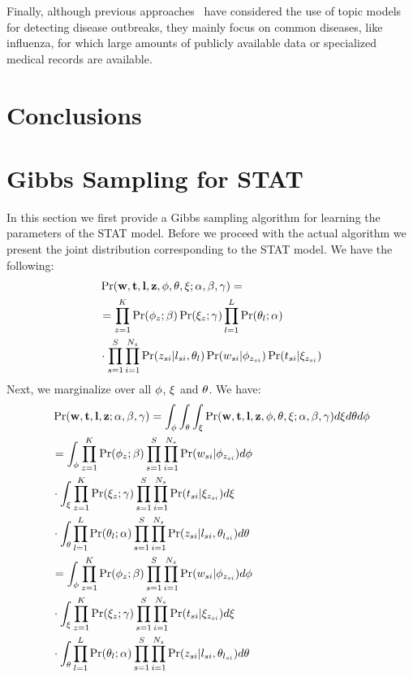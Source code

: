 \documentclass[conference]{IEEEtran}
\newcommand{\model}{{STAT}\xspace} %
\newcommand{\w}{{\bf w}}
\newcommand{\z}{{\bf z}}
\newcommand{\loc}{{\bf l}}
\newcommand{\tim}{{\bf t}}
\begin{document}
Finally, although previous approaches~\cite{paul:11, sadilek:2012, rider:2013} have considered the use of topic models for detecting disease outbreaks, they mainly focus on common diseases, like influenza, for which large amounts of publicly available data or specialized medical records are available. 

\section{Conclusions}
\label{sec:conclusion}




\appendix
\section{Gibbs Sampling for \model}
\label{sec:gibbs}
In this section we first provide a Gibbs sampling algorithm for learning the parameters of the \model model. Before we proceed with the actual algorithm we present the joint distribution corresponding to the \model model. We have the following:
{\scriptsize
\begin{align}
&\Pr(\w,\tim,\loc,\z,{\bf \phi},{\bf \theta},{\bf \xi};\alpha,\beta,\gamma) =  \nonumber \\
&=\prod_{z = 1}^{K}\Pr(\phi_z;\beta)\Pr(\xi_z;\gamma) \prod_{l = 1}^{L}\Pr(\theta_l;\alpha) \nonumber \\
& \cdot \prod_{s = 1}^{S}\prod_{i = 1}^{N_s} \Pr(z_{si}|l_{si},\theta_l)\Pr(w_{si}|\phi_{z_{si}})\Pr(t_{si}|\xi_{z_{si}}) \nonumber
\end{align}}
Next, we marginalize over all ${\bf \phi}$, ${\bf \xi}$ and ${\bf \theta}$. We have:
{\scriptsize
\begin{align}
&\Pr(\w,\tim,\loc,\z;\alpha,\beta,\gamma) =  \int_{\phi}\int_{\theta}\int_{\xi} \Pr(\w,\tim,\loc,\z,{\bf \phi},{\bf \theta},{\bf \xi};\alpha,\beta,\gamma) d\xi d\theta d\phi \nonumber \\
&=\int_{\phi} \prod_{z = 1}^{K}\Pr(\phi_z;\beta) \prod_{s = 1}^{S}\prod_{i = 1}^{N_s}\Pr(w_{si}|\phi_{z_{si}}) d\phi \nonumber \\
& \cdot \int_{\xi} \prod_{z = 1}^{K} \Pr(\xi_z;\gamma)\prod_{s = 1}^{S}\prod_{i = 1}^{N_s}\Pr(t_{si}|\xi_{z_{si}}) d\xi \nonumber \\
&\cdot \int_{\theta} \prod_{l = 1}^{L}\Pr(\theta_l;\alpha)\prod_{s = 1}^{S}\prod_{i = 1}^{N_s}\Pr(z_{si}|l_{si},\theta_{l_{si}})d\theta \nonumber \\
&=\int_{\phi} \prod_{z = 1}^{K}\Pr(\phi_z;\beta) \prod_{s = 1}^{S}\prod_{i = 1}^{N_s}\Pr(w_{si}|\phi_{z_{si}}) d\phi \nonumber \\
&  \cdot \int_{\xi} \prod_{z = 1}^{K} \Pr(\xi_z;\gamma)\prod_{s = 1}^{S}\prod_{i = 1}^{N_s}\Pr(t_{si}|\xi_{z_{si}}) d\xi \nonumber \\
&\cdot \int_{\theta} \prod_{l = 1}^{L}\Pr(\theta_l;\alpha)\prod_{s = 1}^{S}\prod_{i = 1}^{N_s}\Pr(z_{si}|l_{si},\theta_{l_{si}}) d\theta \nonumber
\end{align}
}
\end{document}
